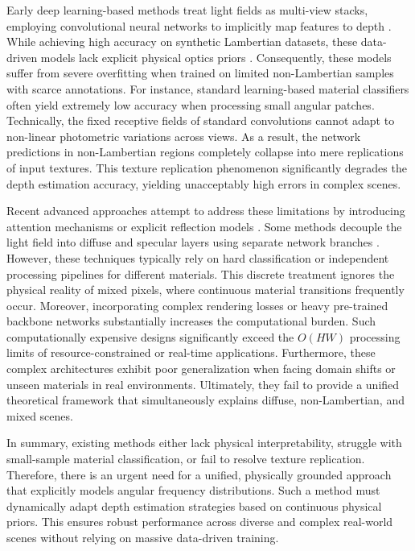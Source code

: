 \documentclass[lettersize,journal]{IEEEtran}
\begin{document}
Early deep learning-based methods treat light fields as multi-view stacks, employing convolutional neural networks to implicitly map features to depth \cite{earlydeeplearningEPINet}. While achieving high accuracy on synthetic Lambertian datasets, these data-driven models lack explicit physical optics priors \cite{physicalopticspriors}. Consequently, these models suffer from severe overfitting when trained on limited non-Lambertian samples with scarce annotations. For instance, standard learning-based material classifiers often yield extremely low accuracy when processing small angular patches. Technically, the fixed receptive fields of standard convolutions cannot adapt to non-linear photometric variations across views. As a result, the network predictions in non-Lambertian regions completely collapse into mere replications of input textures. This texture replication phenomenon significantly degrades the depth estimation accuracy, yielding unacceptably high errors in complex scenes.

Recent advanced approaches attempt to address these limitations by introducing attention mechanisms or explicit reflection models \cite{attentionmechanismsreflectio}. Some methods decouple the light field into diffuse and specular layers using separate network branches \cite{decouplelightfield}. However, these techniques typically rely on hard classification or independent processing pipelines for different materials. This discrete treatment ignores the physical reality of mixed pixels, where continuous material transitions frequently occur. Moreover, incorporating complex rendering losses or heavy pre-trained backbone networks substantially increases the computational burden. Such computationally expensive designs significantly exceed the $O(HW)$ processing limits of resource-constrained or real-time applications. Furthermore, these complex architectures exhibit poor generalization when facing domain shifts or unseen materials in real environments. Ultimately, they fail to provide a unified theoretical framework that simultaneously explains diffuse, non-Lambertian, and mixed scenes.

In summary, existing methods either lack physical interpretability, struggle with small-sample material classification, or fail to resolve texture replication. Therefore, there is an urgent need for a unified, physically grounded approach that explicitly models angular frequency distributions. Such a method must dynamically adapt depth estimation strategies based on continuous physical priors. This ensures robust performance across diverse and complex real-world scenes without relying on massive data-driven training.
\end{document}
